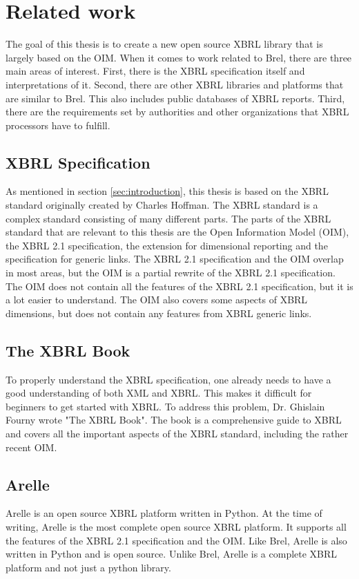 \chapter{Related work}
\label{sec:related_work}

The goal of this thesis is to create a new open source XBRL library that is largely based on the OIM.
When it comes to work related to Brel, there are three main areas of interest.
First, there is the XBRL specification itself and interpretations of it.
Second, there are other XBRL libraries and platforms that are similar to Brel. This also includes public databases of XBRL reports.
Third, there are the requirements set by authorities and other organizations that XBRL processors have to fulfill.

\section{XBRL Specification}
As mentioned in section \ref{sec:introduction}, this thesis is based on the XBRL standard\cite{xbrl} originally created by Charles Hoffman.
The XBRL standard is a complex standard consisting of many different parts.
The parts of the XBRL standard that are relevant to this thesis are the Open Information Model (OIM)\cite{oim}, 
the XBRL 2.1 specification\cite{xbrl21}, 
the extension for dimensional reporting\cite{xbrl_dimensions}
and the specification for generic links\cite{xbrl_generic_links}.
The XBRL 2.1 specification and the OIM overlap in most areas, but the OIM is a partial rewrite of the XBRL 2.1 specification.
The OIM does not contain all the features of the XBRL 2.1 specification, but it is a lot easier to understand.
The OIM also covers some aspects of XBRL dimensions, but does not contain any features from XBRL generic links.

\section{The XBRL Book}
To properly understand the XBRL specification, one already needs to have a good understanding of both XML and XBRL.
This makes it difficult for beginners to get started with XBRL.
To address this problem, Dr. Ghislain Fourny wrote "The XBRL Book"\cite{fourny2023xbrl}.
The book is a comprehensive guide to XBRL and covers all the important aspects of the XBRL standard, including the rather recent OIM.

\section{Arelle}
Arelle\cite{arelle} is an open source XBRL platform written in Python.
At the time of writing, Arelle is the most complete open source XBRL platform.
It supports all the features of the XBRL 2.1 specification and the OIM.
Like Brel, Arelle is also written in Python and is open source.
Unlike Brel, Arelle is a complete XBRL platform and not just a python library.


